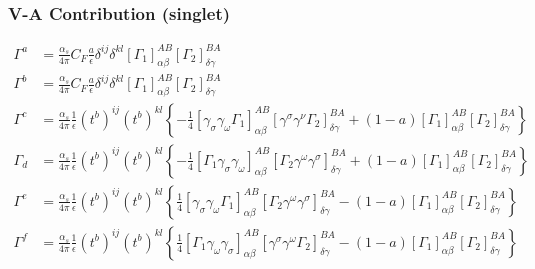 \documentclass{beamer}
\begin{document}
\begin{frame}
\frametitle{V-A Contribution (singlet)}	
\small
\begin{align*}
		\Gamma^a &= \frac{\alpha_s}{4\pi} C_F \frac{a}{\epsilon} \delta^{ij} \delta^{kl} [\Gamma_1]^{AB}_{\alpha\beta} [\Gamma_2]^{BA}_{\delta\gamma} \\
		\Gamma^b &= \frac{\alpha_s}{4\pi} C_F \frac{a}{\epsilon} \delta^{ij} \delta^{kl} [\Gamma_1]^{AB}_{\alpha\beta} [\Gamma_2]^{BA}_{\delta\gamma} \\
		\Gamma^c &= \frac{\alpha_s}{4\pi}\frac{1}{\epsilon} (t^b)^{ij}(t^b)^{kl} \left\{ -\frac{1}{4} \left[\gamma_\sigma \gamma_\omega \Gamma_1\right]^{AB}_{\alpha\beta} \left[\gamma^\sigma\gamma^\nu\Gamma_2\right]^{BA}_{\delta\gamma} + (1-a) \left[\Gamma_1\right]^{AB}_{\alpha\beta}\left[\Gamma_2\right]^{BA}_{\delta\gamma}\right\} \\
		\Gamma_d &= \frac{\alpha_s}{4\pi}\frac{1}{\epsilon} (t^b)^{ij} (t^b)^{kl}  \left\{ -\frac{1}{4}\left[\Gamma_1 \gamma_\sigma \gamma_\omega\right]^{AB}_{\alpha\beta} \left[ \Gamma_2 \gamma^\omega \gamma^\sigma \right ]^{BA}_{\delta\gamma} + (1-a) \left[\Gamma_1\right]^{AB}_{\alpha\beta} \left[ \Gamma_2\right ]^{BA}_{\delta\gamma}\right\} \\
		\Gamma^e &= \frac{\alpha_s}{4\pi}\frac{1}{\epsilon}(t^b)^{ij} (t^b)^{kl}  \left\{ \frac{1}{4}\left[ \gamma_\sigma \gamma_\omega \Gamma_1 \right ]^{AB}_{\alpha\beta} \left[\Gamma_2 \gamma^\omega \gamma^\sigma \right]^{BA}_{\delta\gamma}- (1-a) \left[\Gamma_1\right]^{AB}_{\alpha\beta} \left[\Gamma_2\right]^{BA}_{\delta\gamma} \right\}  \\
		\Gamma^f &= \frac{\alpha_s}{4\pi}\frac{1}{\epsilon} (t^b)^{ij}(t^b)^{kl} \left\{\frac{1}{4}\left[\Gamma_1\gamma_\omega \gamma_\sigma\right]^{AB}_{\alpha\beta}\left[\gamma^\sigma\gamma^\omega\Gamma_2\right]^{BA}_{\delta\gamma} -(1-a)\left[\Gamma_1\right]^{AB}_{\alpha\beta} \left[\Gamma_2\right]^{BA}_{\delta\gamma} \right\} 
\end{align*}
\end{frame}
\end{document}
